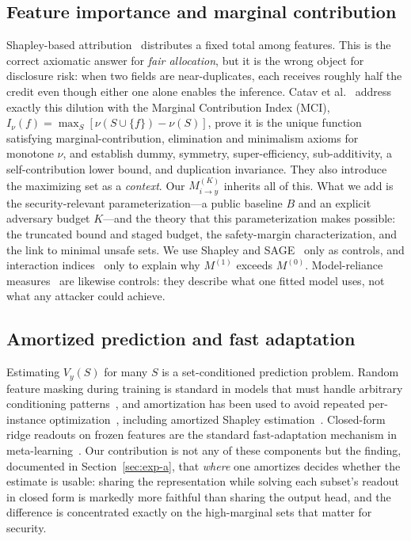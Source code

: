 \documentclass[preprint,12pt]{elsarticle}
\newcommand{\Vy}{V_{y}}
\newcommand{\Mik}{M^{(K)}_{i \to y}}
\begin{document}
\subsection{Feature importance and marginal contribution}
Shapley-based attribution~\cite{shapley1953value,lundberg2017shap,covert2020sage,
williamson2020spvim,covert2021explaining} distributes a fixed total among features. This is
the correct axiomatic answer for \emph{fair allocation}, but it is the wrong object for
disclosure risk: when two fields are near-duplicates, each receives roughly half the credit
even though either one alone enables the inference. Catav et al.~\cite{catav2021mci}
address exactly this dilution with the Marginal Contribution Index (MCI),
$I_\nu(f)=\max_{S}[\nu(S\cup\{f\})-\nu(S)]$, prove it is the unique function satisfying
marginal-contribution, elimination and minimalism axioms for monotone $\nu$, and establish
dummy, symmetry, super-efficiency, sub-additivity, a self-contribution lower bound, and
duplication invariance. They also introduce the maximizing set as a \emph{context}.
Our $\Mik$ inherits all of this. What we add is the security-relevant parameterization---a
public baseline $B$ and an explicit adversary budget $K$---and the theory that this
parameterization makes possible: the truncated bound and staged budget, the safety-margin
characterization, and the link to minimal unsafe sets. We use Shapley and
SAGE~\cite{covert2020sage} only as controls, and interaction
indices~\cite{grabisch1999interaction,sundararajan2020sti} only to explain why $M^{(1)}$
exceeds $M^{(0)}$. Model-reliance measures~\cite{breiman2001rf,fisher2019mcr} are likewise
controls: they describe what one fitted model uses, not what any attacker could achieve.

\subsection{Amortized prediction and fast adaptation}
Estimating $\Vy(S)$ for many $S$ is a set-conditioned prediction problem. Random feature
masking during training is standard in models that must handle arbitrary conditioning
patterns~\cite{ivanov2019vaeac,li2020acflow,you2020grape}, and amortization has been used
to avoid repeated per-instance optimization~\cite{cremer2018inference,amos2023amortized},
including amortized Shapley estimation~\cite{jethani2022fastshap,covert2023vitshapley}.
Closed-form ridge readouts on frozen features are the standard fast-adaptation mechanism in
meta-learning~\cite{bertinetto2019r2d2,lee2019metaoptnet}. Our contribution is not any of
these components but the finding, documented in Section~\ref{sec:exp-a}, that \emph{where}
one amortizes decides whether the estimate is usable: sharing the representation while
solving each subset's readout in closed form is markedly more faithful than sharing the
output head, and the difference is concentrated exactly on the high-marginal sets that
matter for security.
\end{document}
